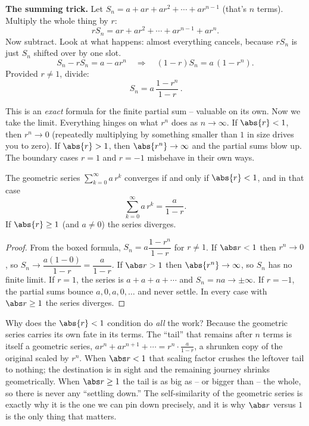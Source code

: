 \begin{focusbox}
\textbf{The summing trick.} Let $S_n = a + ar + ar^2 + \cdots + ar^{n-1}$ (that's $n$ terms). Multiply the whole thing by $r$:
\[
r S_n = ar + ar^2 + \cdots + ar^{n-1} + ar^{n}.
\]
Now subtract. Look at what happens: almost everything cancels, because $rS_n$ is just $S_n$ shifted over by one slot.
\[
S_n - rS_n = a - ar^{n} \quad\Longrightarrow\quad (1-r)S_n = a\,(1 - r^{n}).
\]
Provided $r \neq 1$, divide:
\[
\boxed{\,S_n = a\,\frac{1 - r^{n}}{1 - r}\,}.
\]
\end{focusbox}

This is an \emph{exact} formula for the finite partial sum -- valuable on its own. Now we take the limit. Everything hinges on what $r^n$ does as $n \to \infty$. If $\abs{r} < 1$, then $r^n \to 0$ (repeatedly multiplying by something smaller than $1$ in size drives you to zero). If $\abs{r} > 1$, then $\abs{r^n} \to \infty$ and the partial sums blow up. The boundary cases $r = 1$ and $r = -1$ misbehave in their own ways.

\begin{theorem}
\label{ch29:thm-geometric}
The geometric series $\sum_{k=0}^{\infty} a\, r^k$ converges if and only if $\abs{r} < 1$, and in that case
\[
\sum_{k=0}^{\infty} a\, r^{k} = \frac{a}{1 - r}.
\]
If $\abs{r} \geq 1$ (and $a \neq 0$) the series diverges.
\end{theorem}

\begin{proof}
From the boxed formula, $S_n = a\dfrac{1 - r^n}{1-r}$ for $r \neq 1$. If $\abs r < 1$ then $r^n \to 0$, so $S_n \to \dfrac{a(1-0)}{1-r} = \dfrac{a}{1-r}$. If $\abs r > 1$ then $\abs{r^n}\to\infty$, so $S_n$ has no finite limit. If $r = 1$, the series is $a + a + a + \cdots$ and $S_n = na \to \pm\infty$. If $r = -1$, the partial sums bounce $a, 0, a, 0, \dots$ and never settle. In every case with $\abs r \ge 1$ the series diverges.
\end{proof}

\begin{whybox}
Why does the $\abs{r}<1$ condition do \emph{all} the work? Because the geometric series carries its own fate in its terms. The ``tail'' that remains after $n$ terms is itself a geometric series, $ar^n + ar^{n+1}+\cdots = r^n \cdot \frac{a}{1-r}$, a shrunken copy of the original scaled by $r^n$. When $\abs r < 1$ that scaling factor crushes the leftover tail to nothing; the destination is in sight and the remaining journey shrinks geometrically. When $\abs r \ge 1$ the tail is as big as -- or bigger than -- the whole, so there is never any ``settling down.'' The self-similarity of the geometric series is exactly why it is the one we can pin down precisely, and it is why $\abs r$ versus $1$ is the only thing that matters.
\end{whybox}

